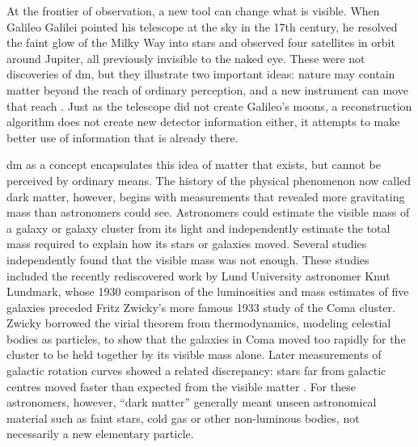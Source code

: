 
At the frontier of observation, a new tool can change what is visible. When
Galileo Galilei pointed his telescope at the sky in the 17th century, he
resolved the faint glow of the Milky Way into stars and observed four
satellites in orbit around Jupiter, all previously invisible to the naked eye.
These were not discoveries of \gls{dm}, but they illustrate two important ideas:
nature may contain matter beyond the reach of ordinary perception, and a new
instrument can move that reach \cite{bertone2016-history-dark-matter}. Just as
the telescope did not create Galileo's moons, a reconstruction algorithm does
not create new detector information either, it attempts to make better use of
information that is already there.



\gls{dm} as a concept encapsulates this idea of matter that exists, but cannot
be perceived by ordinary means. The history of the physical phenomenon now
called dark matter, however, begins with measurements that revealed more
gravitating mass than astronomers could see. Astronomers could estimate the
visible mass of a galaxy or galaxy cluster from its light and independently
estimate the total mass required to explain how its stars or galaxies moved.
Several studies independently found that the visible mass was not enough. 
These studies included the recently rediscovered work by Lund University astronomer Knut Lundmark, whose
1930 comparison of the luminosities and mass estimates of five galaxies
preceded Fritz Zwicky's more famous 1933 study of the Coma cluster. Zwicky borrowed
the virial theorem from thermodynamics, modeling celestial bodies as particles, to show that the galaxies in Coma moved too rapidly for the
cluster to be held together by its visible mass alone.
Later measurements of galactic rotation curves showed a related
discrepancy: stars far from galactic centres moved faster than expected from the
visible matter
\cite{lundmark1930-galaxy-masses,bertone2016-history-dark-matter,
orodruin2016-lundmark-darkmatter}. For these astronomers, however, ``dark
matter'' generally meant unseen astronomical material such as faint stars, cold
gas or other non-luminous bodies, not necessarily a new elementary particle.

